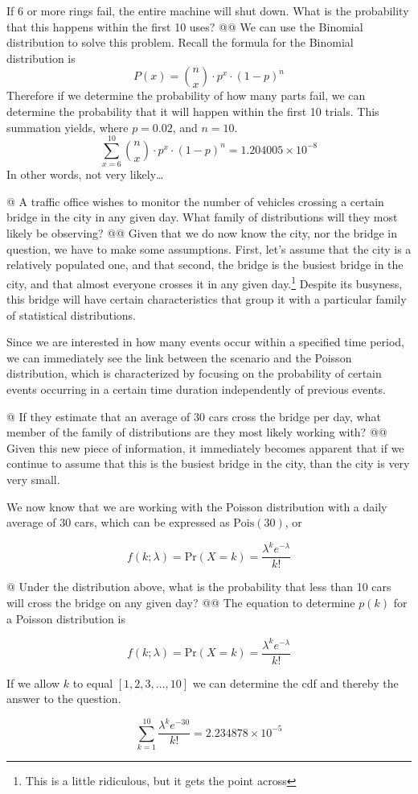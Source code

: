 \documentclass[10pt]{article}
\begin{document}
\begin{easylist}[enumerate]
    If 6 or more rings fail, the entire machine will shut down. What is the probability that this happens within the
    first 10 uses?
    @@ We can use the Binomial distribution to solve this problem. Recall the formula for the Binomial distribution is
        \[ P(x) = \binom{n}{x} \cdot p^x \cdot {(1 - p)}^n \]
        Therefore if we determine the probability of how many parts fail, we can determine the probability that it will
        happen within the first 10 trials. This summation yields, where $p=0.02$, and $n=10$.
        \[ \sum^{10}_{x=6} \binom{n}{x} \cdot p^x \cdot {(1 - p)}^n = \boxed{1.204005 \times 10^{-8}} \]
        In other words, not very likely\ldots

    @ A traffic office wishes to monitor the number of vehicles crossing a certain bridge in the city in any given day.
    What family of distributions will they most likely be observing?
    @@ Given that we do now know the city, nor the bridge in question, we have to make some assumptions. First, let's
    assume that the city is a relatively populated one, and that second, the bridge is the busiest bridge in the city,
    and that almost everyone crosses it in any given day.\footnote{This is a little ridiculous, but it gets the point
    across} Despite its busyness, this bridge will have certain characteristics that group it with a particular family
    of statistical distributions.\newline

    Since we are interested in how many events occur within a specified time period, we can immediately see the link
    between the scenario and the Poisson distribution, which is characterized by focusing on the probability of certain
    events occurring in a certain time duration independently of previous events.

    @ If they estimate that an average of 30 cars cross the bridge per day, what member of the family of distributions
    are they most likely working with?
    @@ Given this new piece of information, it immediately becomes apparent that if we continue to assume that this is
    the busiest bridge in the city, than the city is very very small.\newline

    We now know that we are working with the Poisson distribution with a daily average of 30 cars, which can be
    expressed as $\mathrm{Pois}(30)$, or

        \[ f(k;\lambda) = \mathrm{Pr}(X=k) = \frac{\lambda^k e^{-\lambda}}{k!} \]

    @ Under the distribution above, what is the probability that less than 10 cars will cross the bridge on any given
    day?
    @@ The equation to determine $p(k)$ for a Poisson distribution is

        \[ f(k;\lambda) = \mathrm{Pr}(X=k) = \frac{\lambda^k e^{-\lambda}}{k!} \]

        If we allow $k$ to equal $[1, 2, 3, \ldots, 10]$ we can determine the cdf and thereby the answer to the
        question.

        \[ \sum^{10}_{k=1} \frac{\lambda^k e^{-30}}{k!} = \boxed{2.234878 \times 10^{-5}} \]
\end{easylist}
\end{document}
